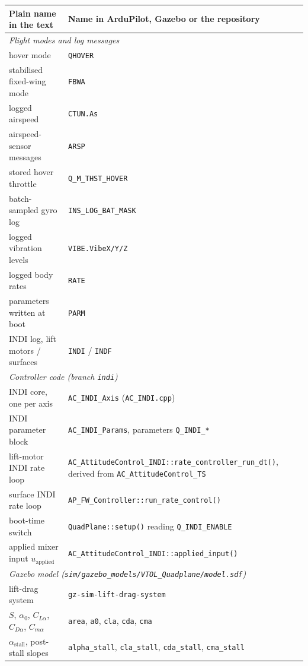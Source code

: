 \documentclass{article}
\begin{document}
\begin{longtable}{p{}p{}}
\textbf{Plain name in the text} & \textbf{Name in ArduPilot, Gazebo or the repository} \\
\midrule
\multicolumn{2}{l}{\emph{Flight modes and log messages}} \\
hover mode & \texttt{QHOVER} \\
stabilised fixed-wing mode & \texttt{FBWA} \\
logged airspeed & \texttt{CTUN.As} \\
airspeed-sensor messages & \texttt{ARSP} \\
stored hover throttle & \texttt{Q\_M\_THST\_HOVER} \\
batch-sampled gyro log & \texttt{INS\_LOG\_BAT\_MASK} \\
logged vibration levels & \texttt{VIBE.VibeX/Y/Z} \\
logged body rates & \texttt{RATE} \\
parameters written at boot & \texttt{PARM} \\
INDI log, lift motors / surfaces & \texttt{INDI} / \texttt{INDF} \\
\midrule
\multicolumn{2}{l}{\emph{Controller code (branch \texttt{indi})}} \\
INDI core, one per axis & \texttt{AC\_INDI\_Axis} (\texttt{AC\_INDI.cpp}) \\
INDI parameter block & \texttt{AC\_INDI\_Params}, parameters \texttt{Q\_INDI\_*} \\
lift-motor INDI rate loop & \texttt{AC\_AttitudeControl\_INDI::rate\_controller\_run\_dt()}, derived from \texttt{AC\_AttitudeControl\_TS} \\
surface INDI rate loop & \texttt{AP\_FW\_Controller::run\_rate\_control()} \\
boot-time switch & \texttt{QuadPlane::setup()} reading \texttt{Q\_INDI\_ENABLE} \\
applied mixer input $u_{\mathrm{applied}}$ & \texttt{AC\_AttitudeControl\_INDI::applied\_input()} \\
\midrule
\multicolumn{2}{l}{\emph{Gazebo model (\texttt{sim/gazebo\_models/VTOL\_Quadplane/model.sdf})}} \\
lift-drag system & \texttt{gz-sim-lift-drag-system} \\
$S$, $\alpha_0$, $C_{L\alpha}$, $C_{D\alpha}$, $C_{m\alpha}$ & \texttt{area}, \texttt{a0}, \texttt{cla}, \texttt{cda}, \texttt{cma} \\
$\alpha_{\mathrm{stall}}$, post-stall slopes & \texttt{alpha\_stall}, \texttt{cla\_stall}, \texttt{cda\_stall}, \texttt{cma\_stall} \\

\end{longtable}
\end{document}
